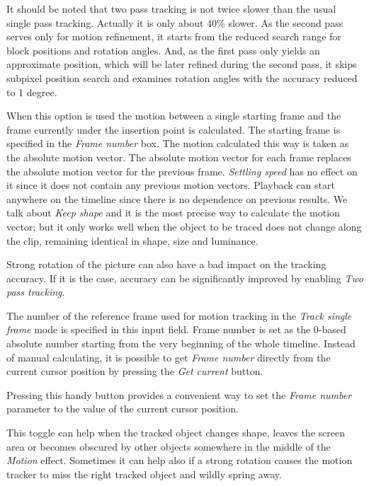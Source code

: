 \begin{description}
    It should be noted that two pass tracking is not twice slower than the usual
    single pass tracking.  Actually it is only about 40\% slower.  As the second
    pass serves only for motion refinement, it starts from the reduced search
    range for block positions and rotation angles.  And, as the first pass only
    yields an approximate position, which will be later refined during the
    second pass, it skips subpixel position search and examines rotation angles
    with the accuracy reduced to 1 degree.
    \item[Track single frame] When this option is used the motion between a single
    starting frame and the frame currently under the insertion point is
    calculated.  The starting frame is specified in the \textit{Frame number} box.  The
    motion calculated this way is taken as the absolute motion vector.  The
    absolute motion vector for each frame replaces the absolute motion vector
    for the previous frame.  \textit{Settling speed} has no effect on it since it does
    not contain any previous motion vectors.  Playback can start anywhere on the
    timeline since there is no dependence on previous results.  We talk about
    \textit{Keep shape} and it is the most precise way to calculate the motion vector;
    but it only works well when the object to be traced does not change along
    the clip, remaining identical in shape, size and luminance.
    
    Strong rotation of the picture can also have a bad impact on the tracking
    accuracy.  If it is the case, accuracy can be significantly improved by
    enabling \textit{Two pass tracking}.
    
    \item[Frame number] The number of the reference frame used for motion tracking in
    the \textit{Track single frame} mode is specified in this input field.  Frame
    number is set as the 0-based absolute number starting from the very
    beginning of the whole timeline.  Instead of manual calculating, it is
    possible to get \textit{Frame number} directly from the current cursor position by
    pressing the \textit{Get current} button.
    
    \item[Get current] Pressing this handy button provides a convenient way to set the
    \textit{Frame number} parameter to the value of the current cursor position.
    
    \item[Add (loaded) offset from tracked frame] This toggle can help when the tracked
    object changes shape, leaves the screen area or becomes obscured by other
    objects somewhere in the middle of the \textit{Motion} effect.  Sometimes it can help
    also if a strong rotation causes the motion tracker to miss the right
    tracked object and wildly spring away.
    

\end{description}
